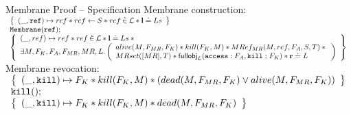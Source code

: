 \documentclass[xcolor=x11names,compress]{beamer}
\renewcommand{\(}{\begin{columns}}
\renewcommand{\)}{\end{columns}}
\newcommand{\<}[1]{\begin{column}{#1}}
\renewcommand{\>}{\end{column}}
\begin{document}
\begin{frame}{Membrane Proof -- Specification}
  Membrane construction:\\[0.2cm]

  \begin{adjustbox}{width=\textwidth,keepaspectratio}
  $
  \begin{array}{l}
    \left\{ \begin{array}{l} 
      (\_, \mathtt{ref}) \mapsto ref \mathbin{*}
      ref \leftarrow S \mathbin{*}
      ref \mathbin{\dot\in} \mathcal{L} \mathbin{*}
      \textbf{l} \doteq Ls
     \end{array} \right\} \\
    \mathtt{Membrane(ref);} \\
    \left\{ \begin{array}{l} 
      (\_, ref) \mapsto ref \mathbin{*}
      ref \mathbin{\dot\in} \mathcal{L} \mathbin{*}
      \textbf{l} \doteq Ls \mathbin{*} {} \\
      \exists M, F_K, F_A, F_{MR}, MR, L \mathpunct{.} \left( \begin{array}{l} 
        alive(M, F_{MR}, F_K) \mathbin{*}
        kill(F_K,M) \mathbin{*}
        MRef_{MR}(M, ref, F_A, S, T) \mathbin{*} {} \\
        MRset([MR],T) \mathbin{*}
        \mathsf{fullobj}_L(\mathtt{access}:F_A,\mathtt{kill}:F_K) \mathbin{*}
        {\mathrm{\textbf{r}}} \doteq L
       \end{array} \right)
     \end{array} \right\}
  \end{array}
  $
\end{adjustbox}\\[0.5cm]

  Membrane revocation:\\[0.2cm]
  \begin{adjustbox}{width=\textwidth,keepaspectratio}
  $
  \begin{array}{l}
    \left\{ \begin{array}{l} 
      (\_,\mathtt{kill}) \mapsto F_K \mathbin{*} kill(F_K,M) \mathbin{*} (dead(M, F_{MR}, F_K)
      \lor alive(M, F_{MR}, F_K))
     \end{array} \right\} \\
    \mathtt{kill();} \\
    \left\{ \begin{array}{l} 
      (\_,\mathtt{kill}) \mapsto F_K \mathbin{*} kill(F_K,M) \mathbin{*} dead(M, F_{MR}, F_K)
     \end{array} \right\} \\
  \end{array}
  $
\end{adjustbox}
\end{frame}
\end{document}
